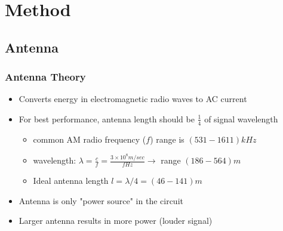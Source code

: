 \documentclass[11pt]{beamer}
\theoremstyle{definition}
\begin{document}
      \section{Method}


         \subsection{Antenna}
               \begin{frame}
                     \frametitle{Antenna Theory}
                     \begin{itemize}[<+->]
                           \item Converts energy in electromagnetic radio waves to AC current
                           \vspace{1.5mm}
                           \item For best performance, antenna length should be $\frac{1}{4}$ of signal wavelength
                           \vspace{1.5mm}
                           \begin{itemize}
                              \item common AM radio frequency ($f$) range is $(531-1611) kHz$
                              \vspace{1mm}
                              \item wavelength: $\lambda = \frac{c}{f} = \frac{3 \times 10^8 m/sec}{f Hz} \rightarrow$ range $(186-564) m$
                              \vspace{1mm}
                              \item Ideal antenna length $l = \lambda/4 = (46-141) m$
                              \vspace{1mm}
                           \end{itemize}
                           \vspace{1.5mm}
                           \item Antenna is only "power source" in the circuit
                           \vspace{1.5mm}
                           \item Larger antenna results in more power (louder signal)
                     \end{itemize}
               \end{frame}
\end{document}
